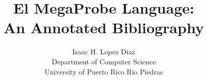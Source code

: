 \documentclass{article}
\title{El MegaProbe Language\@:\\
An Annotated Bibliography}
\author{Isaac H. Lopez Diaz\\
Department of Computer Science\\
University of Puerto Rico Rio Piedras}
\begin{document}
\maketitle


\nocite{*}
\end{document}
